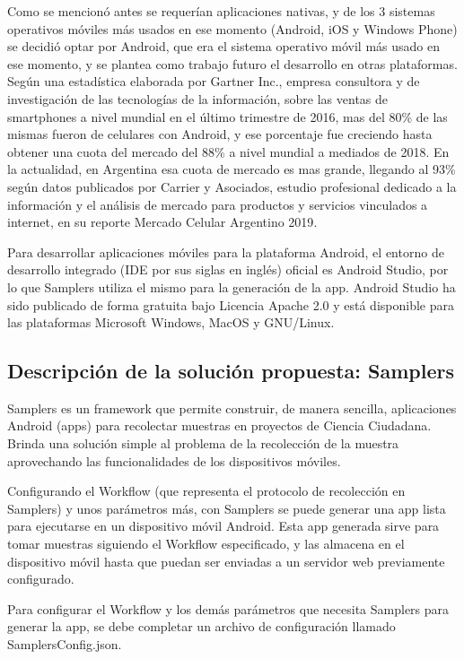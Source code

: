 Como se mencionó antes se requerían aplicaciones nativas, y de los 3 sistemas operativos móviles más usados en ese momento (Android, iOS y Windows Phone) se decidió optar por Android, que era el sistema operativo móvil más usado en ese momento, y se plantea como trabajo futuro el desarrollo en otras plataformas. Según una estadística elaborada por Gartner Inc., empresa consultora y de investigación de las tecnologías de la información, sobre las ventas de smartphones a nivel mundial en el último trimestre de 2016\cite{gartner}, mas del 80\% de las mismas fueron de celulares con Android, y ese porcentaje fue creciendo hasta obtener una cuota del mercado del 88\% a nivel mundial a mediados de 2018. En la actualidad, en Argentina esa cuota de mercado es mas grande, llegando al 93\% según datos publicados por Carrier y Asociados, estudio profesional dedicado a la información y el análisis de mercado para productos y servicios vinculados a internet, en su reporte Mercado Celular Argentino 2019\cite{carrier}.

Para desarrollar aplicaciones móviles para la plataforma Android, el entorno de desarrollo integrado (IDE por sus siglas en inglés) oficial es Android Studio\cite{androidStudio}, por lo que Samplers utiliza el mismo para la generación de la app. Android Studio ha sido publicado de forma gratuita bajo Licencia Apache 2.0 y está disponible para las plataformas Microsoft Windows, MacOS y GNU/Linux.

\clearpage

\subsection{Descripción de la solución propuesta: Samplers}
Samplers es un framework que permite construir, de manera sencilla, aplicaciones Android (apps) para recolectar muestras en proyectos de Ciencia Ciudadana. Brinda una solución simple al problema de la recolección de la muestra aprovechando las funcionalidades de los dispositivos móviles.

Configurando el Workflow (que representa el protocolo de recolección en Samplers) y unos parámetros más, con Samplers se puede generar una app lista para ejecutarse en un dispositivo móvil Android. Esta app generada sirve para tomar muestras siguiendo el Workflow especificado, y las almacena en el dispositivo móvil hasta que puedan ser enviadas a un servidor web previamente configurado.

Para configurar el Workflow y los demás parámetros que necesita Samplers para generar la app, se debe completar un archivo de configuración llamado SamplersConfig.json.

